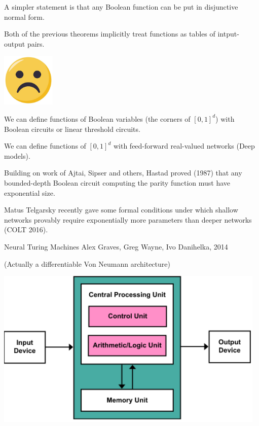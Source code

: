 {\vfill
A simpler statement is that any Boolean function can be put in disjunctive normal form.


Both of the previous theorems implicitly treat functions as tables of intput-output pairs.

\vfill
\centerline{\includegraphics[height = 1in]{../images/Frown}}


We can define functions of Boolean variables (the corners of $[0,1]^d$) with Boolean circuits or linear threshold circuits.

\vfill
We can define functions of $[0,1]^d$ with feed-forward real-valued networks (Deep models).


Building on work of Ajtai, Sipser and others, Hastad proved (1987) that any bounded-depth Boolean circuit computing the parity function must have exponential size. 

\vfill
Matus Telgarsky recently gave some formal conditions under which shallow networks provably require exponentially more parameters than deeper networks (COLT 2016).


Neural Turing Machines
Alex Graves, Greg Wayne, Ivo Danihelka, 2014

\vfill
(Actually a differentiable Von Neumann architecture)

\vfill
\centerline{\includegraphics[height = 3in]{../images/VNA}}

}
